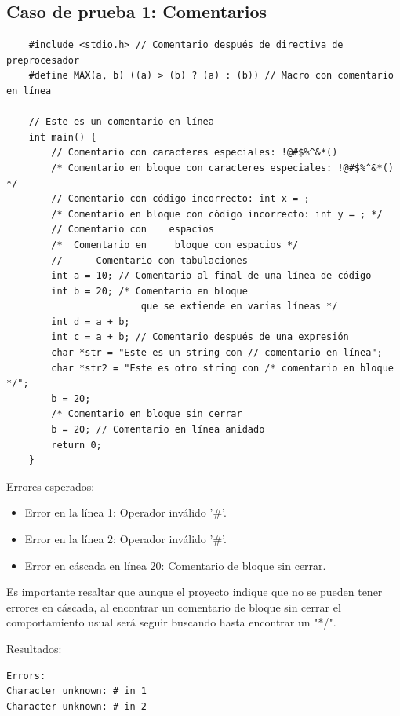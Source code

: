 \documentclass[a4paper,12pt]{article}
\begin{document}
\subsection*{Caso de prueba 1: Comentarios}
\begin{flushleft}
    \begin{verbatim}
    #include <stdio.h> // Comentario después de directiva de preprocesador
    #define MAX(a, b) ((a) > (b) ? (a) : (b)) // Macro con comentario en línea 
        
    // Este es un comentario en línea
    int main() {
        // Comentario con caracteres especiales: !@#$%^&*()
        /* Comentario en bloque con caracteres especiales: !@#$%^&*() */
        // Comentario con código incorrecto: int x = ;
        /* Comentario en bloque con código incorrecto: int y = ; */
        // Comentario con    espacios
        /*  Comentario en     bloque con espacios */
        //      Comentario con tabulaciones
        int a = 10; // Comentario al final de una línea de código
        int b = 20; /* Comentario en bloque
                        que se extiende en varias líneas */ 
        int d = a + b;
        int c = a + b; // Comentario después de una expresión 
        char *str = "Este es un string con // comentario en línea";
        char *str2 = "Este es otro string con /* comentario en bloque */";
        b = 20;
        /* Comentario en bloque sin cerrar
        b = 20; // Comentario en línea anidado
        return 0;
    }
    \end{verbatim}
    Errores esperados:
    \begin{itemize}
        \item Error en la línea 1: Operador inválido '\#'.
        \item Error en la línea 2: Operador inválido '\#'.
        \item Error en cáscada en línea 20: Comentario de bloque sin cerrar.
    \end{itemize}
    \hspace*{2em} Es importante resaltar que aunque el proyecto indique que no se pueden 
    tener errores en cáscada, al encontrar un comentario de bloque sin cerrar el comportamiento
    usual será seguir buscando hasta encontrar un "*/".\par\vspace{1em}
    Resultados:
    \begin{verbatim}
Errors: 
Character unknown: # in 1
Character unknown: # in 2

\end{verbatim}
\end{flushleft}
\end{document}
